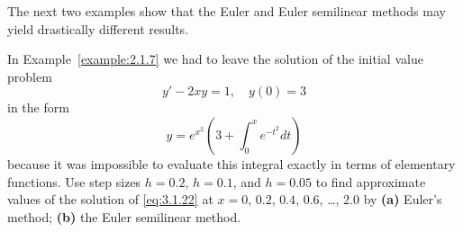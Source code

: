 The next two examples show that the Euler and Euler semilinear methods may yield drastically
different results.

\enlargethispage{3in}

\begin{example}
  \label{example:3.1.4} \rm In Example~\ref{example:2.1.7} we had to leave the solution of the
  initial value problem
  \begin{equation}
    \label{eq:3.1.22}y'-2xy=1,\quad y(0)=3
  \end{equation}
  in the form
  \begin{equation}
    \label{eq:3.1.23}y=e^{x^{2}}\left(3+\int^{x}_{0}e^{-t^{2}}dt\right)
  \end{equation}
  \newpage
  \noindent
  because it was impossible to evaluate this integral exactly in terms of elementary functions. Use
  step sizes $h=0.2$, $h=0.1$, and $h=0.05$ to find approximate values of the solution of
  \eqref{eq:3.1.22} at $x=0$, $0.2$, $0.4$, $0.6$, \dots, $2.0$ by {\bf (a)} Euler's method; {\bf
  (b)} the Euler semilinear method.
\end{example}

